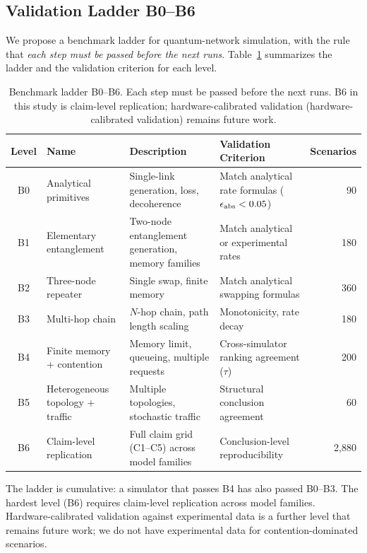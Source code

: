 \documentclass[aps,prapplied,reprint,superscriptaddress]{revtex4-2}
\begin{document}
\subsection{Validation Ladder B0--B6}
\label{sec:ladder}

We propose a benchmark ladder for quantum-network simulation, with the rule that \emph{each step must be passed before the next runs}. Table~\ref{tab:benchmarks} summarizes the ladder and the validation criterion for each level.

\begin{table}[t]
\centering
\caption{Benchmark ladder B0--B6. Each step must be passed before the next runs. B6 in this study is claim-level replication; hardware-calibrated validation (hardware-calibrated validation) remains future work.}
\label{tab:benchmarks}
\begin{tabular}{clp{4.5cm}p{4.5cm}r}
\toprule
Level & Name & Description & Validation Criterion & Scenarios \\
\midrule
B0 & Analytical primitives & Single-link generation, loss, decoherence & Match analytical rate formulas ($\epsilon_{\rm abs} < 0.05$) & 90 \\
B1 & Elementary entanglement & Two-node entanglement generation, memory families & Match analytical or experimental rates & 180 \\
B2 & Three-node repeater & Single swap, finite memory & Match analytical swapping formulas & 360 \\
B3 & Multi-hop chain & $N$-hop chain, path length scaling & Monotonicity, rate decay & 180 \\
B4 & Finite memory + contention & Memory limit, queueing, multiple requests & Cross-simulator ranking agreement ($\tau$) & 200 \\
B5 & Heterogeneous topology + traffic & Multiple topologies, stochastic traffic & Structural conclusion agreement & 60 \\
B6 & Claim-level replication & Full claim grid (C1--C5) across model families & Conclusion-level reproducibility & 2{,}880 \\
\bottomrule
\end{tabular}
\end{table}

The ladder is cumulative: a simulator that passes B4 has also passed B0--B3. The hardest level (B6) requires claim-level replication across model families. Hardware-calibrated validation against experimental data is a further level that remains future work; we do not have experimental data for contention-dominated scenarios.
\end{document}
